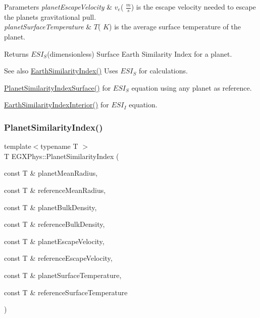 \begin{DoxyParams}{Parameters}
{\em planet\+Escape\+Velocity} & $v_e$( $\frac{m}{s}$) is the escape velocity needed to escape the planet\textquotesingle{}s gravitational pull. \\
\hline
{\em planet\+Surface\+Temperature} & $T$( $K$) is the average surface temperature of the planet. \\
\hline
\end{DoxyParams}
\begin{DoxyReturn}{Returns}
$ESI_S$(dimensionless) Surface Earth Similarity Index for a planet. 
\end{DoxyReturn}
\begin{DoxySeeAlso}{See also}
\hyperlink{group___astrophysics_ga4b86397b1c839c49ac599d49fda207d4}{Earth\+Similarity\+Index()} Uses $ESI_S$ for calculations. 

\hyperlink{group___astrophysics_gae0c7dce2779d66b0560ca388a34ddc39}{Planet\+Similarity\+Index\+Surface()} for $ESI_S$ equation using any planet as reference. 

\hyperlink{group___astrophysics_ga699bcc2f17b8855eaa856595d8032f61}{Earth\+Similarity\+Index\+Interior()} for $ESI_I$ equation. 
\end{DoxySeeAlso}
\mbox{\label{group___astrophysics_ga62e8b781c301df60bd04af3183a965eb}} 
\subsubsection{\texorpdfstring{Planet\+Similarity\+Index()}{PlanetSimilarityIndex()}}
{\footnotesize\ttfamily template$<$typename T $>$ \\
T E\+G\+X\+Phys\+::\+Planet\+Similarity\+Index (\begin{DoxyParamCaption}\item[{const T \&}]{planet\+Mean\+Radius,  }\item[{const T \&}]{reference\+Mean\+Radius,  }\item[{const T \&}]{planet\+Bulk\+Density,  }\item[{const T \&}]{reference\+Bulk\+Density,  }\item[{const T \&}]{planet\+Escape\+Velocity,  }\item[{const T \&}]{reference\+Escape\+Velocity,  }\item[{const T \&}]{planet\+Surface\+Temperature,  }\item[{const T \&}]{reference\+Surface\+Temperature }\end{DoxyParamCaption})}



